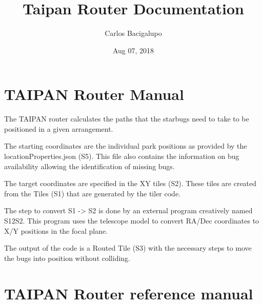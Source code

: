 \documentclass[letterpaper,10pt,english]{sphinxmanual}
\title{Taipan Router Documentation}
\date{Aug 07, 2018}
\author{Carlos Bacigalupo}
\let\sphinxpxdimen\pdfpxdimen\else\newdimen\sphinxpxdimen
\begin{document}
\maketitle
\sphinxtableofcontents
{}\label{\detokenize{index::doc}}



\chapter{TAIPAN Router Manual}
\label{\detokenize{manual:taipan-router-documentation}}\label{\detokenize{manual:taipan-router-manual}}\label{\detokenize{manual::doc}}
The TAIPAN router calculates the paths that the starbugs need to take to be
positioned in a given arrangement.

The starting coordinates are the individual park positions as provided by the
locationProperties.json (S5). This file also contains the information on bug
availability allowing the identification of missing bugs.

The target coordinates are specified in the XY tiles (S2). These tiles are
created from the Tiles (S1) that are generated by the tiler code.

The step to convert S1 -\textgreater{} S2 is done by an external program creatively named S12S2.
This program uses the telescope model to convert RA/Dec coordinates to X/Y
positions in the focal plane.

The output of the code is a Routed Tile (S3) with the necessary steps to move the bugs
into position without colliding.

\noindent{\hspace*{\fill}\sphinxincludegraphics[width=800\sphinxpxdimen]{{GFP}.png}\hspace*{\fill}}


\chapter{TAIPAN Router reference manual}
\label{\detokenize{reference:taipan-router-reference-manual}}\label{\detokenize{reference:module-taipanPyRouter}}\label{\detokenize{reference::doc}}
\end{document}
